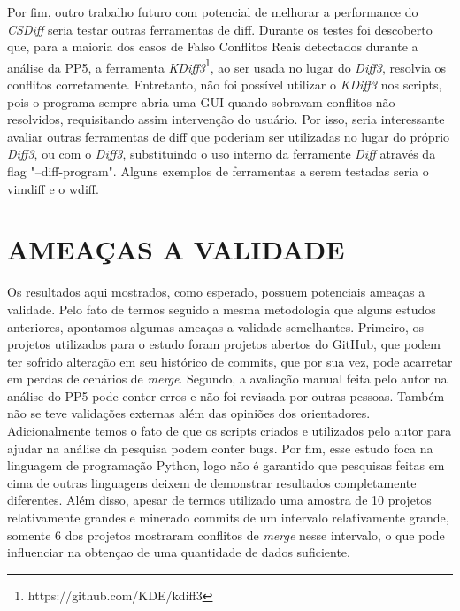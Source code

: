 Por fim, outro trabalho futuro com potencial de melhorar a performance do
\emph{CSDiff} seria testar outras ferramentas de diff. Durante os testes foi
descoberto que, para a maioria dos casos de Falso Conflitos Reais detectados
durante a análise da PP5, a ferramenta
\emph{KDiff3}\footnote{https://github.com/KDE/kdiff3}, ao ser usada no lugar do
\emph{Diff3}, resolvia os conflitos corretamente. Entretanto, não foi possível
utilizar o \emph{KDiff3} nos scripts, pois o programa sempre abria uma GUI
quando sobravam conflitos não resolvidos, requisitando assim intervenção do
usuário. Por isso, seria interessante avaliar outras ferramentas de diff que
poderiam ser utilizadas no lugar do próprio \emph{Diff3}, ou com o
\emph{Diff3}, substituindo o uso interno da ferramente \emph{Diff} através da
flag "--diff-program". Alguns exemplos de ferramentas a serem testadas seria o
vimdiff e o wdiff.

\section{AMEAÇAS A VALIDADE}

Os resultados aqui mostrados, como esperado, possuem potenciais ameaças a
validade. Pelo fato de termos seguido a mesma metodologia que alguns estudos
anteriores, apontamos algumas ameaças a validade semelhantes. Primeiro, os
projetos utilizados para o estudo foram projetos abertos do GitHub, que podem
ter sofrido alteração em seu histórico de commits, que por sua vez, pode
acarretar em perdas de cenários de \emph{merge}. Segundo, a avaliação manual
feita pelo autor na análise do PP5 pode conter erros e não foi revisada por
outras pessoas. Também não se teve validações externas além das opiniões dos
orientadores. Adicionalmente temos o fato de que os scripts criados e utilizados pelo
autor para ajudar na análise da pesquisa podem conter bugs. Por fim, esse
estudo foca na linguagem de programação Python, logo não é garantido que
pesquisas feitas em cima de outras linguagens deixem de demonstrar resultados
completamente diferentes. Além disso, apesar de termos utilizado uma amostra de
10 projetos relativamente grandes e minerado commits de um intervalo
relativamente grande, somente 6 dos projetos mostraram conflitos de
\emph{merge} nesse intervalo, o que pode influenciar na obtençao de uma
quantidade de dados suficiente.





